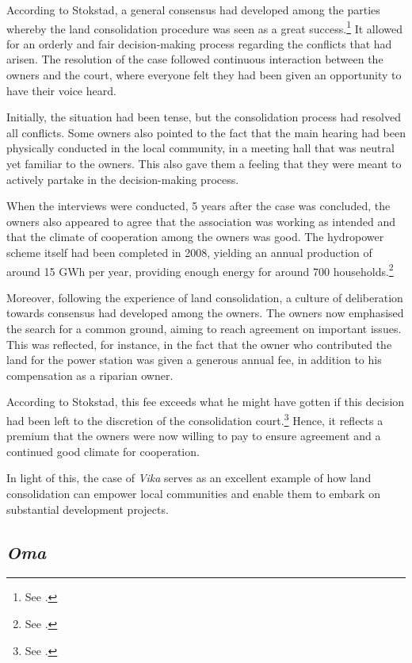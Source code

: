 According to Stokstad, a general consensus had developed among the parties whereby the land consolidation procedure was seen as a great success.\footnote{See \cite[39-41]{stokstad11}.} It allowed for an orderly and fair decision-making process regarding the conflicts that had arisen. The resolution of the case followed continuous interaction between the owners and the court, where everyone felt they had been given an opportunity to have their voice heard. 

Initially, the situation had been tense, but the consolidation process had resolved all conflicts. Some owners also pointed to the fact that the main hearing had been physically conducted in the local community, in a meeting hall that was neutral yet familiar to the owners. This also gave them a feeling that they were meant to actively partake in the decision-making process. 

When the interviews were conducted, 5 years after the case was concluded, the owners also appeared to agree that the association was working as intended and that the climate of cooperation among the owners was good. The hydropower scheme itself had been completed in 2008, yielding an annual production of around 15 GWh per year, providing enough energy for around 700 households.\footnote{See \cite[41]{stokstad11}.}

Moreover, following the experience of land consolidation, a culture of deliberation towards consensus had developed among the owners. The owners now emphasised the search for a common ground, aiming to reach agreement on important issues. This was reflected, for instance, in the fact that the owner who contributed the land for the power station was given a generous annual fee, in addition to his compensation as a riparian owner.

According to Stokstad, this fee exceeds what he might have gotten if this decision had been left to the discretion of the consolidation court.\footnote{See \cite[40]{stokstad11}.} Hence, it reflects a premium that the owners were now willing to pay to ensure agreement and a continued good climate for cooperation.

In light of this, the case of \emph{Vika} serves as an excellent example of how land consolidation can empower local communities and enable them to embark on substantial development projects.

\subsection{\emph{Oma}}\label{sec:6:4:2}

